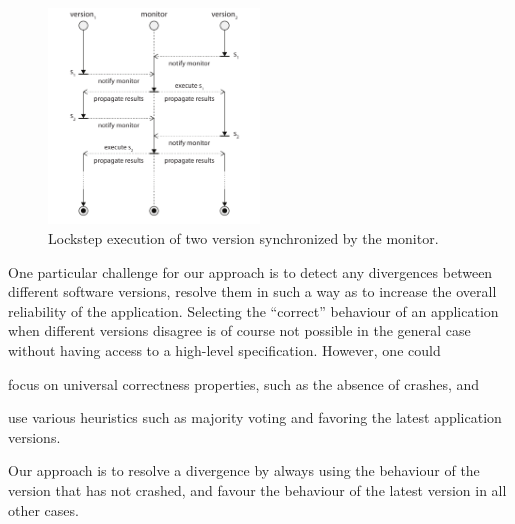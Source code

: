 \begin{figure}[t]
  \begin{center}
    \includegraphics[width=0.5\textwidth]{multi-version/figures/lockstep}
    \caption{Lockstep execution of two version synchronized by the monitor.}
    \label{fig:mx-platform}
  \end{center}
\end{figure}

One particular challenge for our approach is to detect any divergences between
different software versions, resolve them in such a way as to increase the
overall reliability of the application.%
Selecting the ``correct'' behaviour of an application when different versions
disagree is of course not possible in the general case without having access to
a high-level specification.  However, one could%
\begin{inparaenum}[(1)]
\item focus on universal correctness properties, such as the absence of
  crashes, and
\item use various heuristics such as majority voting and favoring the latest
  application versions.
\end{inparaenum}
Our approach is to resolve a divergence by always using the behaviour of the
version that has not crashed, and favour the behaviour of the latest version in
all other cases. %


